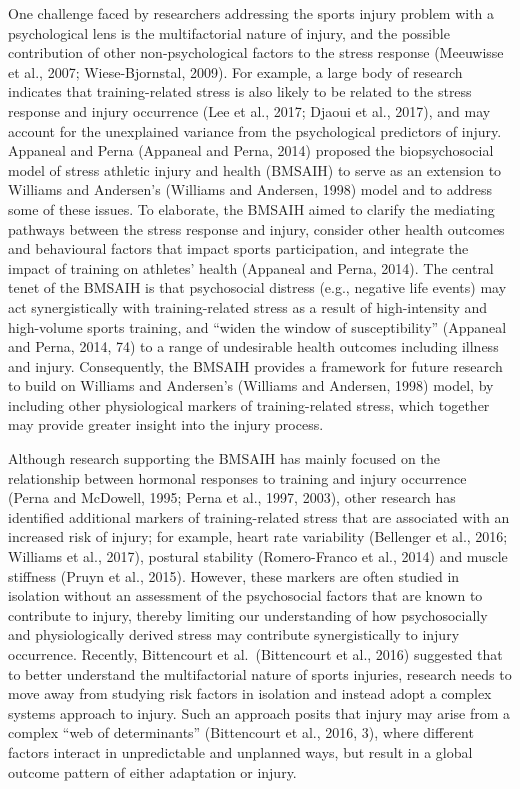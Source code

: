 \documentclass[utf8]{frontiersHLTH}
\begin{document}
One challenge faced by researchers addressing the sports injury problem
with a psychological lens is the multifactorial nature of injury, and
the possible contribution of other non-psychological factors to the
stress response (Meeuwisse et al., 2007; Wiese-Bjornstal, 2009). For
example, a large body of research indicates that training-related stress
is also likely to be related to the stress response and injury
occurrence (Lee et al., 2017; Djaoui et al., 2017), and may account for
the unexplained variance from the psychological predictors of injury.
Appaneal and Perna (Appaneal and Perna, 2014) proposed the
biopsychosocial model of stress athletic injury and health (BMSAIH) to
serve as an extension to Williams and Andersen's (Williams and Andersen,
1998) model and to address some of these issues. To elaborate, the
BMSAIH aimed to clarify the mediating pathways between the stress
response and injury, consider other health outcomes and behavioural
factors that impact sports participation, and integrate the impact of
training on athletes' health (Appaneal and Perna, 2014). The central
tenet of the BMSAIH is that psychosocial distress (e.g., negative life
events) may act synergistically with training-related stress as a result
of high-intensity and high-volume sports training, and ``widen the
window of susceptibility'' (Appaneal and Perna, 2014, 74) to a range of
undesirable health outcomes including illness and injury. Consequently,
the BMSAIH provides a framework for future research to build on Williams
and Andersen's (Williams and Andersen, 1998) model, by including other
physiological markers of training-related stress, which together may
provide greater insight into the injury process.

Although research supporting the BMSAIH has mainly focused on the
relationship between hormonal responses to training and injury
occurrence (Perna and McDowell, 1995; Perna et al., 1997, 2003), other
research has identified additional markers of training-related stress
that are associated with an increased risk of injury; for example, heart
rate variability (Bellenger et al., 2016; Williams et al., 2017),
postural stability (Romero-Franco et al., 2014) and muscle stiffness
(Pruyn et al., 2015). However, these markers are often studied in
isolation without an assessment of the psychosocial factors that are
known to contribute to injury, thereby limiting our understanding of how
psychosocially and physiologically derived stress may contribute
synergistically to injury occurrence. Recently, Bittencourt et
al.~(Bittencourt et al., 2016) suggested that to better understand the
multifactorial nature of sports injuries, research needs to move away
from studying risk factors in isolation and instead adopt a complex
systems approach to injury. Such an approach posits that injury may
arise from a complex ``web of determinants'' (Bittencourt et al., 2016,
3), where different factors interact in unpredictable and unplanned
ways, but result in a global outcome pattern of either adaptation or
injury.
\end{document}
